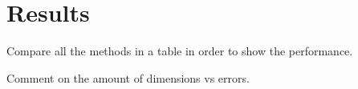 \section{Results}

Compare all the methods in a table in order to show the performance.

Comment on the amount of dimensions vs errors.

